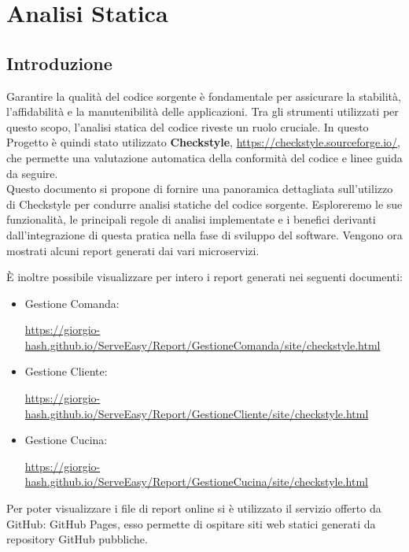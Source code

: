 \section{Analisi Statica}

\subsection{Introduzione}

Garantire la qualità del codice sorgente è fondamentale per assicurare la stabilità, l'affidabilità e la manutenibilità delle applicazioni. Tra gli strumenti utilizzati per questo scopo, l'analisi statica del codice riveste un ruolo cruciale. In questo Progetto è quindi stato utilizzato \textbf{Checkstyle}, \href{https://checkstyle.sourceforge.io/}{https://checkstyle.sourceforge.io/}, che permette una valutazione automatica della conformità del codice e linee guida da seguire.
\\
Questo documento si propone di fornire una panoramica dettagliata sull'utilizzo di Checkstyle per condurre analisi statiche del codice sorgente. Esploreremo le sue funzionalità, le principali regole di analisi implementate e i benefici derivanti dall'integrazione di questa pratica nella fase di sviluppo del software. Vengono ora mostrati alcuni report generati dai vari microservizi.


È inoltre possibile visualizzare per intero i report generati nei seguenti documenti:


\begin{itemize}
	\item Gestione Comanda: 
	
	{\small 	\href{https://giorgio-hash.github.io/ServeEasy/Report/GestioneComanda/site/checkstyle.html}{https://giorgio-hash.github.io/ServeEasy/Report/GestioneComanda/site/checkstyle.html}}
	\item Gestione Cliente: 
	
	{\small 	\href{https://giorgio-hash.github.io/ServeEasy/Report/GestioneCliente/site/checkstyle.html}{https://giorgio-hash.github.io/ServeEasy/Report/GestioneCliente/site/checkstyle.html}}
	\item Gestione Cucina: 
	
	{\small \href{https://giorgio-hash.github.io/ServeEasy/Report/GestioneCucina/site/checkstyle.html}{https://giorgio-hash.github.io/ServeEasy/Report/GestioneCucina/site/checkstyle.html}}
\end{itemize}
Per poter visualizzare i file di report online si è utilizzato il servizio offerto da GitHub: GitHub Pages\cite{github-pages}, esso permette di ospitare siti web statici generati da repository GitHub pubbliche.

